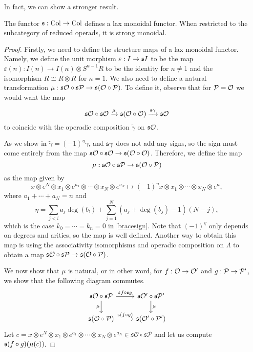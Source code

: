 \documentclass[join.tex]{subfiles}
\begin{document}
In fact, we can show a stronger result.

\begin{propo}
The functor $\mathfrak{s}:\mathrm{Col}\to \mathrm{Col}$ defines a lax monoidal functor. When restricted to the subcategory of reduced operads, it is strong monoidal.
\end{propo}
\begin{proof}
Firstly, we need to define the structure maps of a lax monoidal functor. Namely, we define the unit morphism $\varepsilon:I\to\mathfrak{s} I$ to be the map $\varepsilon(n):I(n)\to I(n)\otimes S^{n-1}R$ to be the identity for $n\neq 1$ and the isomorphism $R\cong R\otimes R$ for $n=1$. We also need to define a natural transformation $\mu:\mathfrak{s}{\mathcal O}\circ\mathfrak{s}\mathcal{P}\to\mathfrak{s}({\mathcal O}\circ\mathcal{P})$. To define it, observe that for $\mathcal{P}={\mathcal O}$ we would want the map

\[\mathfrak{s}{\mathcal O}\circ\mathfrak{s}{\mathcal O}\xrightarrow{\mu}\mathfrak{s}({\mathcal O}\circ{\mathcal O})\xrightarrow{\mathfrak{s}\gamma}\mathfrak{s}{\mathcal O}\]
 to coincide with the operadic composition $\tilde{\gamma}$ on $\mathfrak{s}{\mathcal O}$. 
 
 As we show in  $\tilde{\gamma}=(-1)^\eta\gamma$, and $\mathfrak{s}\gamma$ does not add any signs, so the sign must come entirely from the map $\mathfrak{s}{\mathcal O}\circ\mathfrak{s}{\mathcal O}\to\mathfrak{s}({\mathcal O}\circ{\mathcal O})$. Therefore, we define the map \[\mu:\mathfrak{s}{\mathcal O}\circ\mathfrak{s}\mathcal{P}\to\mathfrak{s}({\mathcal O}\circ\mathcal{P})\] as the map given by
 \[x\otimes e^N\otimes x_1\otimes e^{a_1}\otimes\cdots\otimes x_N\otimes e^{a_N}\mapsto (-1)^\eta x\otimes x_1\otimes\cdots\otimes x_N \otimes e^n,\]
 where $a_1+\cdots+a_N=n$ and 
 \[\eta=\sum_{j<l}a_j\deg(b_l)+\sum_{j=1}^N (a_j+\deg(b_j)-1)(N-j),\]
 which is the case $k_0=\cdots=k_n=0$ in \cref{bracesign}. Note that $(-1)^\eta$ only depends on degrees and arities, so the map is well defined. Another way to obtain this map is using the associativity isomorphisms and operadic composition on $\Lambda$ to obtain a map $\mathfrak{s}{\mathcal O}\circ\mathfrak{s}\mathcal{P}\to\mathfrak{s}({\mathcal O}\circ\mathcal{P})$.
 
We now show that $\mu$ is natural, or in other word, for $f:{\mathcal O}\to{\mathcal O}'$ and $g:\mathcal{P}\to\mathcal{P}'$, we show that the following diagram commutes.
\[\begin{tikzcd}
\mathfrak{s}\mathcal{O}\circ\mathfrak{s}\mathcal{P} \arrow[r, "\mathfrak{s}f\circ\mathfrak{s}g"] \arrow[d, "\mu"'] & \mathfrak{s}\mathcal{O}'\circ\mathfrak{s}\mathcal{P}' \arrow[d, "\mu"] \\
\mathfrak{s}(\mathcal{O}\circ\mathcal{P}) \arrow[r, "\mathfrak{s}(f\circ g)"]                                      & \mathfrak{s}(\mathcal{O}'\circ\mathcal{P}')                           
\end{tikzcd}\]
 Let $c=x\otimes e^N\otimes x_1\otimes e^{a_1}\otimes\cdots\otimes x_N\otimes e^{a_N}\in \mathfrak{s}\mathcal{O}\circ\mathfrak{s}\mathcal{P}$ and let us compute $\mathfrak{s}(f\circ g)(\mu(c))$. 
 

\end{proof}
\end{document}
